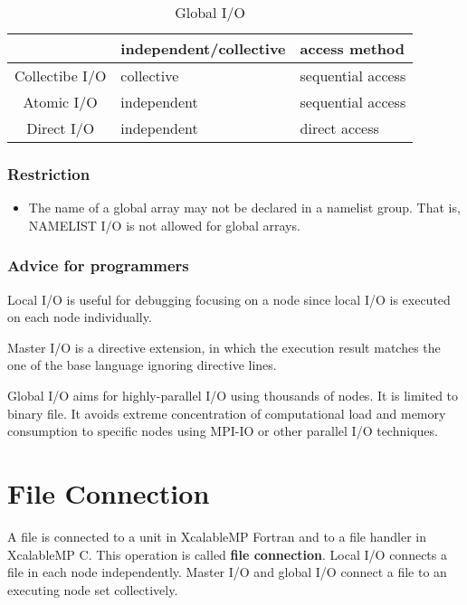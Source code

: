   \begin{table}[tb]
   \begin{center}
    \caption{Global I/O}
    \label{tb:global}
    \begin{tabular}{|c||l|l|}
     \hline 
     & independent/collective & access method  \\ \hline \hline
     Collectibe I/O & collective & sequential access \\ \hline
     Atomic I/O & independent & sequential access \\ \hline
     Direct I/O & independent & direct access \\ \hline
    \end{tabular}
   \end{center}
  \end{table}
  
  \subsubsection*{Restriction}

  \begin{itemize}
   \item  The name of a global array may not be declared in a namelist
	  group.
	  That is, NAMELIST I/O is not allowed for global arrays.
  \end{itemize}

  \subsubsection*{Advice for programmers}

  Local I/O is useful for debugging focusing on a node since local I/O
  is executed on each node individually.

  Master I/O is a directive extension, in which the execution result
  matches the one of the base language ignoring directive lines.

  Global I/O aims for highly-parallel I/O using thousands of nodes.
  It is limited to binary file.
  It avoids extreme concentration of computational load and memory
  consumption to specific nodes using MPI-IO or other parallel I/O
  techniques.

  \section{File Connection}

  A file is connected to a unit in XcalableMP Fortran and to a file
  handler in XcalableMP C.
  This operation is called {\bf file connection}.
  Local I/O connects a file in each node independently.
  Master I/O and global I/O connect a file to an executing node set
  collectively.
  
